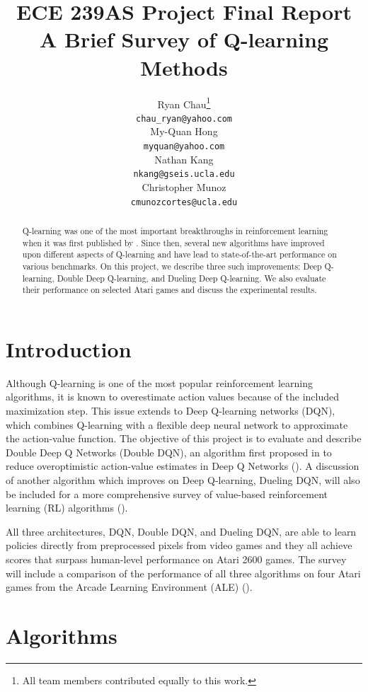 \documentclass{article}
\title{ECE 239AS Project Final Report \\ A Brief Survey of Q-learning Methods}
\author{%
    Ryan Chau\thanks{All team members contributed equally to this work.} \\
    \texttt{chau\_ryan@yahoo.com}\\
    \And
    My-Quan Hong\footnotemark[1]\\
    \texttt{myquan@yahoo.com} \\
    \And
    Nathan Kang\footnotemark[1]\\
    \texttt{nkang@gseis.ucla.edu} \\
    \And
    Christopher Munoz\footnotemark[1]\\
    \texttt{cmunozcortes@ucla.edu} \\
}
\begin{document}
\maketitle

\begin{abstract}
    Q-learning was one of the most important breakthroughs in reinforcement
    learning when it was first published by \cite{watkins1989learning}. Since
    then, several new algorithms have improved upon different aspects of
    Q-learning and have lead to state-of-the-art performance on various
    benchmarks. On this project, we describe three such improvements: Deep
    Q-learning, Double Deep Q-learning, and Dueling Deep Q-learning. We also
    evaluate their performance on selected Atari games and discuss the
    experimental results.
\end{abstract}

\section{Introduction}
Although Q-learning is one of the most popular reinforcement learning
algorithms, it is known to overestimate action values because of the included
maximization step. This issue extends to Deep Q-learning networks (DQN), which
combines Q-learning with a flexible deep neural network to approximate the
action-value function. The objective of this project is to evaluate and describe
Double Deep Q Networks (Double DQN), an algorithm first proposed in
\citet{van2016deep} to reduce overoptimistic action-value estimates in Deep Q
Networks (\cite{mnih2015human}). A discussion of another algorithm which
improves on Deep Q-learning, Dueling DQN, will also be included for a more
comprehensive survey of value-based reinforcement learning (RL) algorithms
(\cite{wang2016dueling}).

All three architectures, DQN, Double DQN, and Dueling DQN, are able to learn
policies directly from preprocessed pixels from video games and they all achieve
scores that surpass human-level performance on Atari 2600 games.  The survey
will include a comparison of the performance of all three algorithms on four
Atari games from the Arcade Learning Environment (ALE)
(\cite{bellemare2013arcade}).

\section{Algorithms}
\end{document}
